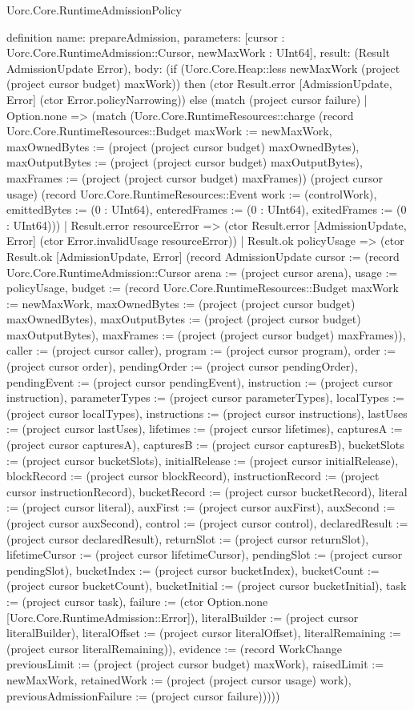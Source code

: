 \begin{lexlean}{Uorc.Core.RuntimeAdmissionPolicy}
\begin{semanticmodule}
definition{
  name: prepareAdmission,
  parameters: [cursor : Uorc.Core.RuntimeAdmission::Cursor, newMaxWork : UInt64],
  result: (Result AdmissionUpdate Error),
  body: (if (Uorc.Core.Heap::less newMaxWork (project (project cursor budget) maxWork)) then (ctor Result.error [AdmissionUpdate, Error] (ctor Error.policyNarrowing)) else (match (project cursor failure)
    | Option.none => (match (Uorc.Core.RuntimeResources::charge (record Uorc.Core.RuntimeResources::Budget {maxWork := newMaxWork, maxOwnedBytes := (project (project cursor budget) maxOwnedBytes), maxOutputBytes := (project (project cursor budget) maxOutputBytes), maxFrames := (project (project cursor budget) maxFrames)}) (project cursor usage) (record Uorc.Core.RuntimeResources::Event {work := (controlWork), emittedBytes := (0 : UInt64), enteredFrames := (0 : UInt64), exitedFrames := (0 : UInt64)}))
      | Result.error resourceError => (ctor Result.error [AdmissionUpdate, Error] (ctor Error.invalidUsage resourceError))
      | Result.ok policyUsage => (ctor Result.ok [AdmissionUpdate, Error] (record AdmissionUpdate {cursor := (record Uorc.Core.RuntimeAdmission::Cursor {arena := (project cursor arena), usage := policyUsage, budget := (record Uorc.Core.RuntimeResources::Budget {maxWork := newMaxWork, maxOwnedBytes := (project (project cursor budget) maxOwnedBytes), maxOutputBytes := (project (project cursor budget) maxOutputBytes), maxFrames := (project (project cursor budget) maxFrames)}), caller := (project cursor caller), program := (project cursor program), order := (project cursor order), pendingOrder := (project cursor pendingOrder), pendingEvent := (project cursor pendingEvent), instruction := (project cursor instruction), parameterTypes := (project cursor parameterTypes), localTypes := (project cursor localTypes), instructions := (project cursor instructions), lastUses := (project cursor lastUses), lifetimes := (project cursor lifetimes), capturesA := (project cursor capturesA), capturesB := (project cursor capturesB), bucketSlots := (project cursor bucketSlots), initialRelease := (project cursor initialRelease), blockRecord := (project cursor blockRecord), instructionRecord := (project cursor instructionRecord), bucketRecord := (project cursor bucketRecord), literal := (project cursor literal), auxFirst := (project cursor auxFirst), auxSecond := (project cursor auxSecond), control := (project cursor control), declaredResult := (project cursor declaredResult), returnSlot := (project cursor returnSlot), lifetimeCursor := (project cursor lifetimeCursor), pendingSlot := (project cursor pendingSlot), bucketIndex := (project cursor bucketIndex), bucketCount := (project cursor bucketCount), bucketInitial := (project cursor bucketInitial), task := (project cursor task), failure := (ctor Option.none [Uorc.Core.RuntimeAdmission::Error]), literalBuilder := (project cursor literalBuilder), literalOffset := (project cursor literalOffset), literalRemaining := (project cursor literalRemaining)}), evidence := (record WorkChange {previousLimit := (project (project cursor budget) maxWork), raisedLimit := newMaxWork, retainedWork := (project (project cursor usage) work), previousAdmissionFailure := (project cursor failure)})})))
}
\end{semanticmodule}
\end{lexlean}
